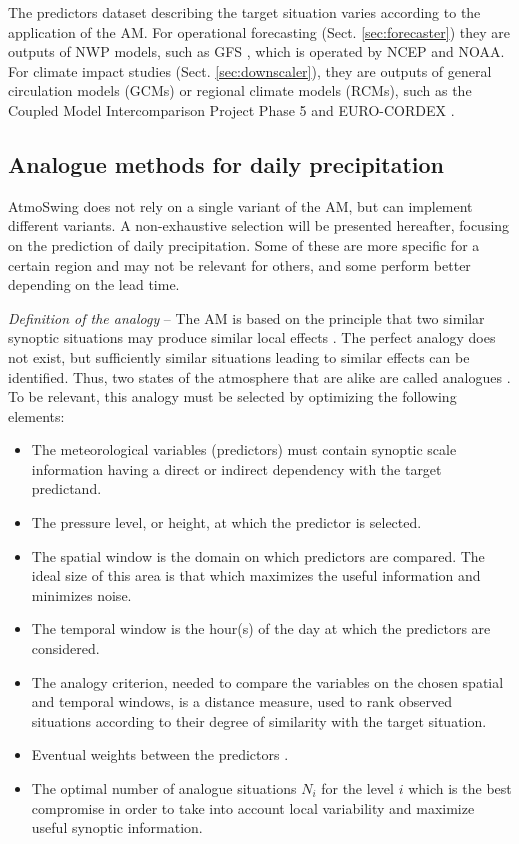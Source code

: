 \documentclass[review]{elsarticle}
\begin{document}
The predictors dataset describing the target situation varies according to the application of the AM. For operational forecasting (Sect. \ref{sec:forecaster}) they are outputs of NWP models, such as GFS \citep[Global Forecast System,][]{Kanamitsu1991,Kanamitsu1989}, which is operated by NCEP and NOAA. For climate impact studies (Sect. \ref{sec:downscaler}), they are outputs of general circulation models (GCMs) or regional climate models (RCMs), such as the Coupled Model Intercomparison Project Phase 5 \citep[CMIP5,][]{Taylor2012} and EURO-CORDEX \citep{Jacob2014}.


\subsection{Analogue methods for daily precipitation}
\label{sec:method}

AtmoSwing does not rely on a single variant of the AM, but can implement different variants. A non-exhaustive selection will be presented hereafter, focusing on the prediction of daily precipitation. Some of these are more specific for a certain region and may not be relevant for others, and some perform better depending on the lead time.

\textit{Definition of the analogy} -- The AM is based on the principle that two similar synoptic situations may produce similar local effects \citep{Lorenz1956}. The perfect analogy does not exist, but sufficiently similar situations leading to similar effects can be identified. Thus, two states of the atmosphere that are alike are called analogues \citep{Lorenz1969}. To be relevant, this analogy must be selected by optimizing the following elements:

\begin{itemize}		
	\item The meteorological variables (predictors) must contain synoptic scale information having a direct or indirect dependency with the target predictand.
	\item The pressure level, or height, at which the predictor is selected.
	\item The spatial window is the domain on which predictors are compared. The ideal size of this area is that which maximizes the useful information and minimizes noise.
	\item The temporal window is the hour(s) of the day at which the predictors are considered.
	\item The analogy criterion, needed to compare the variables on the chosen spatial and temporal windows, is a distance measure, used to rank observed situations according to their degree of similarity with the target situation.
	\item Eventual weights between the predictors \cite[e.g.,][]{Horton2017b, Junk2015}.
	\item The optimal number of analogue situations $N_{i}$ for the level $i$ which is the best compromise in order to take into account local variability and maximize useful synoptic information.
\end{itemize}
\end{document}
